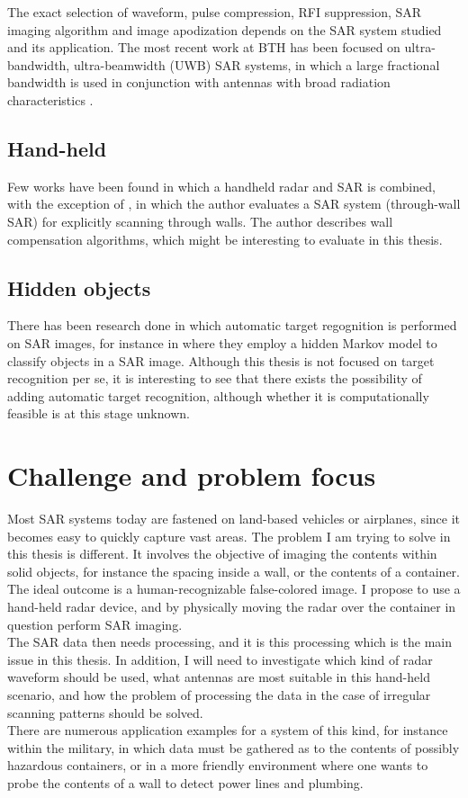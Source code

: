 \documentclass{chi2012}
\begin{document}
The exact selection of waveform, pulse compression, RFI suppression, SAR imaging algorithm and image apodization depends on the SAR system studied and its application. The most recent work at BTH has been focused on ultra-bandwidth, ultra-beamwidth (UWB) SAR systems, in which a large fractional bandwidth is used in conjunction with antennas with broad radiation characteristics \cite{viet-dissertation}.

\subsection{Hand-held}
Few works have been found in which a handheld radar and SAR is combined, with the exception of \cite{chan-twsar}, in which the author evaluates a SAR system (through-wall SAR) for explicitly scanning through walls. The author describes wall compensation algorithms, which might be interesting to evaluate in this thesis.

\subsection{Hidden objects}
There has been research done in which automatic target regognition is performed on SAR images, for instance in \cite{bhanu-occluded} where they employ a hidden Markov model to classify objects in a SAR image. Although this thesis is not focused on target recognition per se, it is interesting to see that there exists the possibility of adding automatic target recognition, although whether it is computationally feasible is at this stage unknown.

\section{Challenge and problem focus}
Most SAR systems today are fastened on land-based vehicles or airplanes, since it becomes easy to quickly capture vast areas. The problem I am trying to solve in this thesis is different. It involves the objective of imaging the contents within solid objects, for instance the spacing inside a wall, or the contents of a container. The ideal outcome is a human-recognizable false-colored image. I propose to use a hand-held radar device, and by physically moving the radar over the container in question perform SAR imaging.
\\
The SAR data then needs processing, and it is this processing which is the main issue in this thesis. In addition, I will need to investigate which kind of radar waveform should be used, what antennas are most suitable in this hand-held scenario, and how the problem of processing the data in the case of irregular scanning patterns should be solved.
\\
There are numerous application examples for a system of this kind, for instance within the military, in which data must be gathered as to the contents of possibly hazardous containers, or in a more friendly environment where one wants to probe the contents of a wall to detect power lines and plumbing.
\end{document}

